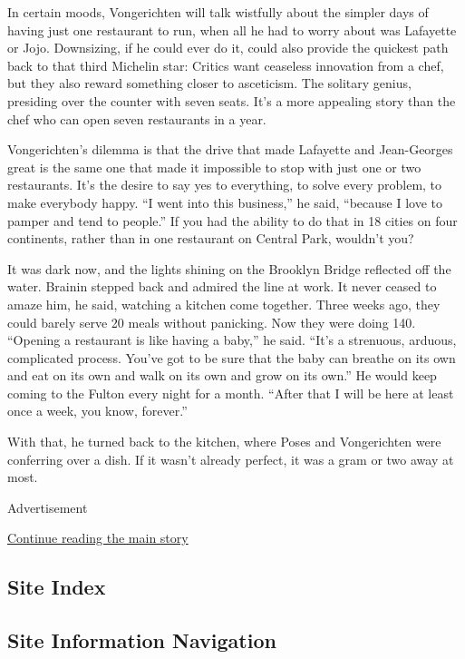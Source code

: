 In certain moods, Vongerichten will talk wistfully about the simpler
days of having just one restaurant to run, when all he had to worry
about was Lafayette or Jojo. Downsizing, if he could ever do it, could
also provide the quickest path back to that third Michelin star: Critics
want ceaseless innovation from a chef, but they also reward something
closer to asceticism. The solitary genius, presiding over the counter
with seven seats. It's a more appealing story than the chef who can open
seven restaurants in a year.

Vongerichten's dilemma is that the drive that made Lafayette and
Jean-Georges great is the same one that made it impossible to stop with
just one or two restaurants. It's the desire to say yes to everything,
to solve every problem, to make everybody happy. ``I went into this
business,'' he said, ``because I love to pamper and tend to people.'' If
you had the ability to do that in 18 cities on four continents, rather
than in one restaurant on Central Park, wouldn't you?

It was dark now, and the lights shining on the Brooklyn Bridge reflected
off the water. Brainin stepped back and admired the line at work. It
never ceased to amaze him, he said, watching a kitchen come together.
Three weeks ago, they could barely serve 20 meals without panicking. Now
they were doing 140. ``Opening a restaurant is like having a baby,'' he
said. ``It's a strenuous, arduous, complicated process. You've got to be
sure that the baby can breathe on its own and eat on its own and walk on
its own and grow on its own.'' He would keep coming to the Fulton every
night for a month. ``After that I will be here at least once a week, you
know, forever.''

With that, he turned back to the kitchen, where Poses and Vongerichten
were conferring over a dish. If it wasn't already perfect, it was a gram
or two away at most.

Advertisement

\protect\hyperlink{after-bottom}{Continue reading the main story}

\hypertarget{site-index}{%
\subsection{Site Index}\label{site-index}}

\hypertarget{site-information-navigation}{%
\subsection{Site Information
Navigation}\label{site-information-navigation}}

